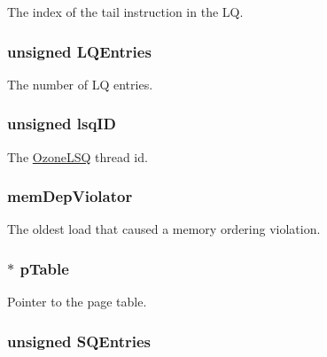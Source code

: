 \label{classOzoneLSQ_a973a489225da164cc85e690f13c86841}
The index of the tail instruction in the LQ. \hypertarget{classOzoneLSQ_aafa99d800d574095881acbacdbbbcc47}{
\subsubsection[{LQEntries}]{\setlength{\rightskip}{0pt plus 5cm}unsigned {\bf LQEntries}}}
\label{classOzoneLSQ_aafa99d800d574095881acbacdbbbcc47}
The number of LQ entries. \hypertarget{classOzoneLSQ_adfd96fbbaa327a31d20f0d4134418fad}{
\subsubsection[{lsqID}]{\setlength{\rightskip}{0pt plus 5cm}unsigned {\bf lsqID}}}
\label{classOzoneLSQ_adfd96fbbaa327a31d20f0d4134418fad}
The \hyperlink{classOzoneLSQ}{OzoneLSQ} thread id. \hypertarget{classOzoneLSQ_a270a20c3fa52139e0538288275db9d22}{
\subsubsection[{memDepViolator}]{ {\bf memDepViolator}}}
\label{classOzoneLSQ_a270a20c3fa52139e0538288275db9d22}
The oldest load that caused a memory ordering violation. \hypertarget{classOzoneLSQ_ad14ffa23ad731f6003755b643f999049}{
\subsubsection[{pTable}]{$\ast$ {\bf pTable}}}
\label{classOzoneLSQ_ad14ffa23ad731f6003755b643f999049}
Pointer to the page table. \hypertarget{classOzoneLSQ_a38c8af5392da70119dc5cce4e3637cbc}{
\subsubsection[{SQEntries}]{\setlength{\rightskip}{0pt plus 5cm}unsigned {\bf SQEntries}}}
